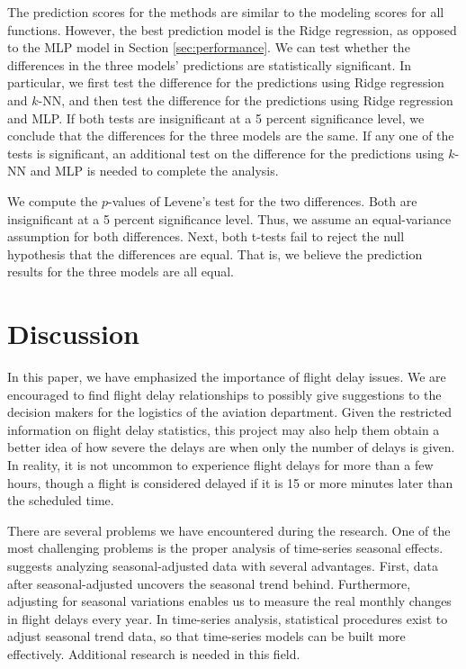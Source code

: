 \documentclass[11pt]{article}
\begin{document}
The prediction scores for the methods are similar to the modeling scores for all functions. However, the best prediction model is the Ridge regression, as opposed to the MLP model in Section \ref{sec:performance}. We can test whether the differences in the three models' predictions are statistically significant. In particular, we first test the difference for the predictions using Ridge regression and $k$-NN, and then test the difference for the predictions using Ridge regression and MLP. If both tests are insignificant at a 5 percent significance level, we conclude that the differences for the three models are the same. If any one of the tests is significant, an additional test on the difference for the predictions using $k$-NN and MLP is needed to complete the analysis.

We compute the $p$-values of Levene’s test for the two differences. Both are insignificant at a 5 percent significance level. Thus, we assume an equal-variance assumption for both differences. Next, both t-tests fail to reject the null hypothesis that the differences are equal. That is, we believe the prediction results for the three models are all equal.

\section{Discussion}\label{sec:discussion}
In this paper, we have emphasized the importance of flight delay issues. We are encouraged to find flight delay relationships to possibly give suggestions to the decision makers for the logistics of the aviation department. Given the restricted information on flight delay statistics, this project may also help them  obtain a better idea of how severe the delays are when only the number of delays is given. In reality, it is not uncommon to experience flight delays for more than a few hours, though a flight is considered delayed if it is 15 or more minutes later than the scheduled time.

There are several problems we have encountered during the research. One of the most challenging problems is the proper analysis of time-series seasonal effects. \citep{web:bts5} suggests analyzing seasonal-adjusted data with several advantages. First, data after seasonal-adjusted uncovers the seasonal trend behind. Furthermore, adjusting for seasonal variations enables us to measure the real monthly changes in flight delays every year. In time-series analysis, statistical procedures exist to adjust seasonal trend data, so that time-series models can be built more effectively. Additional research is needed in this field.
\end{document}
